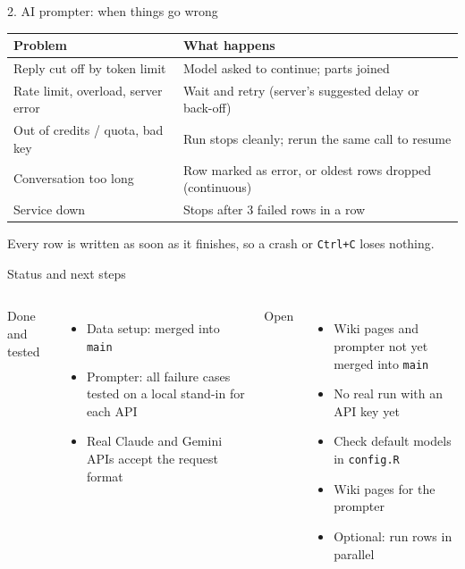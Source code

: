 \documentclass[aspectratio=169,10pt]{beamer}
\newcommand{\code}[1]{\texttt{#1}}
\begin{document}
\begin{frame}{2. AI prompter: when things go wrong}
  \small
  \begin{tabular}{@{}p{}p{}@{}}
    \toprule
    Problem & What happens \\
    \midrule
    Reply cut off by token limit & Model asked to continue; parts joined \\
    Rate limit, overload, server error & Wait and retry (server's suggested delay or back-off) \\
    Out of credits / quota, bad key & Run stops cleanly; \alert{rerun the same call to resume} \\
    Conversation too long & Row marked as error, or oldest rows dropped (continuous) \\
    Service down & Stops after 3 failed rows in a row \\
    \bottomrule
  \end{tabular}
  \vfill
  Every row is written as soon as it finishes, so a crash or \code{Ctrl+C} loses nothing.
\end{frame}

\begin{frame}{Status and next steps}
  \begin{columns}[T]
      \alert{Done and tested}
      \begin{itemize}\small
        \item Data setup: merged into \code{main}
        \item Prompter: all failure cases tested on a local stand-in for each API
        \item Real Claude and Gemini APIs accept the request format
      \end{itemize}
      \alert{Open}
      \begin{itemize}\small
        \item Wiki pages and prompter not yet merged into \code{main}
        \item No real run with an API key yet
        \item Check default models in \code{config.R}
        \item Wiki pages for the prompter
        \item Optional: run rows in parallel
      \end{itemize}
  \end{columns}
\end{frame}
\end{document}
